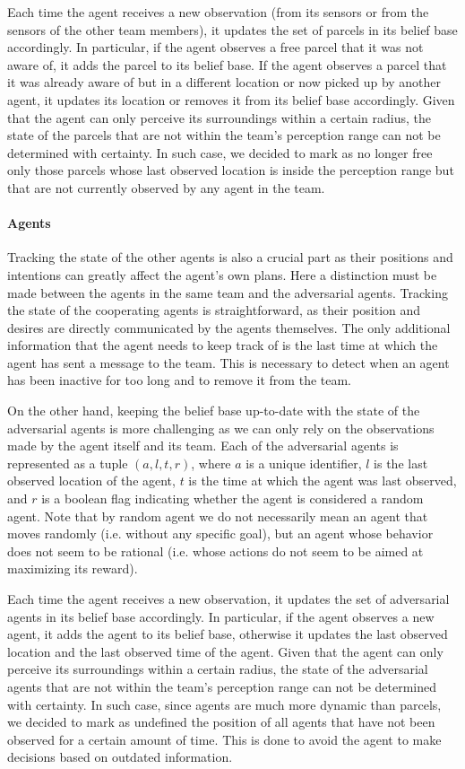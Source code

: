 Each time the agent receives a new observation (from its sensors or from the sensors of the other team members), it updates the set of parcels in its belief base accordingly. In particular, if the agent observes a free parcel that it was not aware of, it adds the parcel to its belief base. If the agent observes a parcel that it was already aware of but in a different location or now picked up by another agent, it updates its location or removes it from its belief base accordingly. Given that the agent can only perceive its surroundings within a certain radius, the state of the parcels that are not within the team's perception range can not be determined with certainty. In such case, we decided to mark as no longer free only those parcels whose last observed location is inside the perception range but that are not currently observed by any agent in the team.

\paragraph*{Agents}
Tracking the state of the other agents is also a crucial part as their positions and intentions can greatly affect the agent's own plans. Here a distinction must be made between the agents in the same team and the adversarial agents. Tracking the state of the cooperating agents is straightforward, as their position and desires are directly communicated by the agents themselves. The only additional information that the agent needs to keep track of is the last time at which the agent has sent a message to the team. This is necessary to detect when an agent has been inactive for too long and to remove it from the team.

On the other hand, keeping the belief base up-to-date with the state of the adversarial agents is more challenging as we can only rely on the observations made by the agent itself and its team. Each of the adversarial agents is represented as a tuple $(a, l, t, r)$, where $a$ is a unique identifier, $l$ is the last observed location of the agent, $t$ is the time at which the agent was last observed, and $r$ is a boolean flag indicating whether the agent is considered a random agent. Note that by random agent we do not necessarily mean an agent that moves randomly (i.e. without any specific goal), but an agent whose behavior does not seem to be rational (i.e. whose actions do not seem to be aimed at maximizing its reward).

Each time the agent receives a new observation, it updates the set of adversarial agents in its belief base accordingly. In particular, if the agent observes a new agent, it adds the agent to its belief base, otherwise it updates the last observed location and the last observed time of the agent. Given that the agent can only perceive its surroundings within a certain radius, the state of the adversarial agents that are not within the team's perception range can not be determined with certainty. In such case, since agents are much more dynamic than parcels, we decided to mark as undefined the position of all agents that have not been observed for a certain amount of time. This is done to avoid the agent to make decisions based on outdated information.

